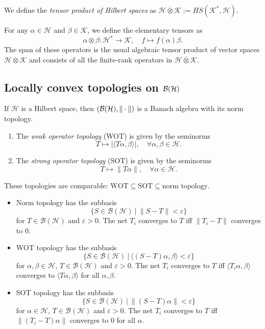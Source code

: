 \begin{definition}
  We define the \emph{tensor product of Hilbert spaces} as $\mathcal{H} \overline{\otimes} \mathcal{K} := HS (\mathcal{K}^*, \mathcal{H})$. 
\end{definition}

\begin{remark}
  For any $\alpha \in \mathcal{H}$ and $\beta \in \mathcal{K}$, we define the elementary tensors as 
  $$\alpha \otimes \beta: \mathcal{H}^* \to \mathcal{K},\quad f \mapsto f(\alpha) \beta.$$
  The span of these operators is the usual algebraic tensor product of vector spaces $\mathcal{H} \otimes \mathcal{K}$ and
  consists of all the finite-rank operators in $\mathcal{H} \overline{\otimes} \mathcal{K}$.
\end{remark}

\subsection{Locally convex topologies on $\operatorname{\mathcal{B} (\mathcal{H})}$}

If $\mathcal{H}$ is a Hilbert space, then $(\operatorname{\mathcal{B} (\mathcal{H})}, \| \cdot\|)$
is a Banach algebra with its norm topology.

\begin{definition}
  \begin{enumerate}
    \item The \emph{weak operator topology} (WOT) is given by the seminorms 
    $$T \mapsto |\langle T\alpha, \beta\rangle|,\quad \forall \alpha, \beta \in \mathcal{H}.$$
    \item The \emph{strong operator topology} (SOT) is given by the seminorms 
    $$T \mapsto \|T\alpha\|,\quad \forall \alpha \in \mathcal{H}.$$
  \end{enumerate}
\end{definition}

These topologies are comparable: $\mathrm{WOT} \subseteq \mathrm{SOT} \subseteq \textrm{norm topology}$.
\begin{itemize}
  \item Norm topology has the subbasis $$\{S \in \mathcal{B}(\mathcal{H})\ |\ \| S - T\| < \varepsilon \}$$
for $T \in \mathcal{B}(\mathcal{H})$ and $\varepsilon > 0$. The net $T_i$ converges to $T$ iff $\| T_i - T\|$ converges to $0$.
  \item WOT topology has the subbasis $$\{S \in \mathcal{B}(\mathcal{H})\ |\ \langle (S - T) \alpha, \beta \rangle < \varepsilon \}$$
  for $\alpha, \beta \in \mathcal{H}$, $T \in \mathcal{B}(\mathcal{H})$ and $\varepsilon > 0$. The net $T_i$ converges to $T$ iff $\langle T_i \alpha, \beta \rangle$ converges to $\langle T \alpha, \beta \rangle$ for all $\alpha, \beta$.
  \item SOT topology has the subbasis $$\{S \in \mathcal{B}(\mathcal{H})\ |\ \| (S - T) \alpha\| < \varepsilon \}$$
  for $\alpha \in \mathcal{H}$, $T \in \mathcal{B}(\mathcal{H})$ and $\varepsilon > 0$. The net $T_i$ converges to $T$ iff $\| (T_i - T)\alpha \|$ converges to $0$ for all $\alpha$.
\end{itemize}


